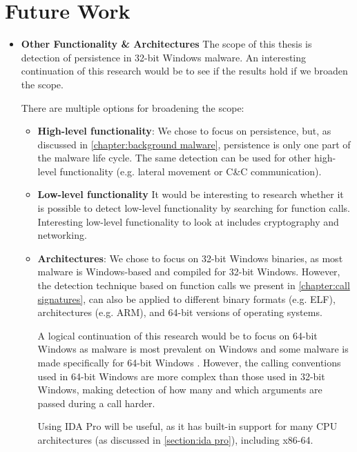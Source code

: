 \chapter{Future Work}\label{chapter:future work}
\begin{itemize}
    \item \textbf{Other Functionality \& Architectures} The scope of this thesis is detection of persistence in 32-bit Windows malware. An interesting continuation of this research would be to see if the results hold if we broaden the scope.

    There are multiple options for broadening the scope:
    \begin{itemize}

        \item \textbf{High-level functionality}: We chose to focus on persistence, but, as discussed in \autoref{chapter:background malware}, persistence is only one part of the malware life cycle. The same detection can be used for other high-level functionality (e.g. lateral movement or C\&C communication).

        \item \textbf{Low-level functionality} It would be interesting to research whether it is possible to detect low-level functionality by searching for function calls. Interesting low-level functionality to look at includes cryptography and networking.

        \item \textbf{Architectures}: We chose to focus on 32-bit Windows binaries, as most malware is Windows-based and compiled for 32-bit Windows. However, the detection technique based on function calls we present in \autoref{chapter:call signatures}, can also be applied to different binary formats (e.g. ELF), architectures (e.g. ARM), and 64-bit versions of operating systems.

        A logical continuation of this research would be to focus on 64-bit Windows as malware is most prevalent on Windows and some malware is made specifically for 64-bit Windows \cite{64-bit-malware}. However, the calling conventions used in 64-bit Windows are more complex than those used in 32-bit Windows, making detection of how many and which arguments are passed during a call harder.

        Using IDA Pro will be useful, as it has built-in support for many CPU architectures (as discussed in \autoref{section:ida pro}), including x86-64.
    \end{itemize}


\end{itemize}
